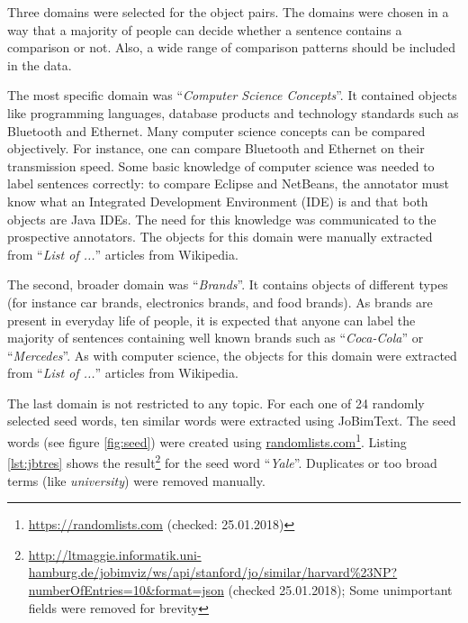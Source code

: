 Three domains were selected for the object pairs. The domains were chosen in a way that a majority of people can decide whether a sentence contains a comparison or not. Also, a wide range of comparison patterns should be included in the data.

The most specific domain was \enquote{\emph{Computer Science Concepts}}. It contained objects like programming languages, database products and technology standards such as Bluetooth and Ethernet.  Many computer science concepts can be compared objectively. For instance, one can compare Bluetooth and Ethernet on their transmission speed. Some basic knowledge of computer science was needed to label sentences correctly: to compare Eclipse and NetBeans, the annotator must know what an Integrated Development Environment (IDE) is and that both objects are Java IDEs.  The need for this knowledge was communicated to the prospective annotators. The objects for this domain were manually extracted from \enquote{\emph{List of ...}} articles from Wikipedia.

The second, broader domain was \enquote{\emph{Brands}}. It contains objects of different types (for instance car brands, electronics brands, and food brands). As brands are present in everyday life of people, it is expected that anyone can label the majority of sentences containing well known brands such as \enquote{\emph{Coca-Cola}} or \enquote{\emph{Mercedes}}. As with computer science, the objects for this domain were extracted from \enquote{\emph{List of ...}} articles from Wikipedia.

The last domain is not restricted to any topic. For each one of 24 randomly selected seed words, ten similar words were extracted using JoBimText. The seed words (see figure \ref{fig:seed}) were created using \url{randomlists.com}\footnote{\url{https://randomlists.com}  (checked: 25.01.2018)}. Listing \ref{lst:jbtres} shows the result\footnote{\url{http://ltmaggie.informatik.uni-hamburg.de/jobimviz/ws/api/stanford/jo/similar/harvard\%23NP?numberOfEntries=10&format=json} (checked 25.01.2018); Some unimportant fields were removed for brevity} for the seed word \enquote{\emph{Yale}}. Duplicates or too broad terms (like \emph{university}) were removed manually.

